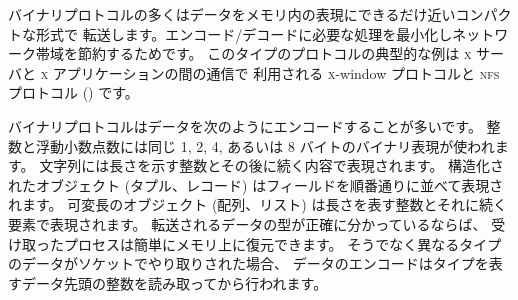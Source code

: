 バイナリプロトコルの多くはデータをメモリ内の表現にできるだけ近いコンパクトな形式で
転送します。エンコード/デコードに必要な処理を最小化しネットワーク帯域を節約するためです。
このタイプのプロトコルの典型的な例は \textsc{x} サーバと \textsc{x} アプリケーションの間の通信で
利用される \textsc{x}-window プロトコルと \textsc{nfs} プロトコル () です。

バイナリプロトコルはデータを次のようにエンコードすることが多いです。
整数と浮動小数点数には同じ 1, 2, 4, あるいは 8 バイトのバイナリ表現が使われます。
文字列には長さを示す整数とその後に続く内容で表現されます。
構造化されたオブジェクト (タプル、レコード) はフィールドを順番通りに並べて表現されます。
可変長のオブジェクト (配列、リスト) は長さを表す整数とそれに続く要素で表現されます。
転送されるデータの型が正確に分かっているならば、
受け取ったプロセスは簡単にメモリ上に復元できます。
そうでなく異なるタイプのデータがソケットでやり取りされた場合、
データのエンコードはタイプを表すデータ先頭の整数を読み取ってから行われます。

